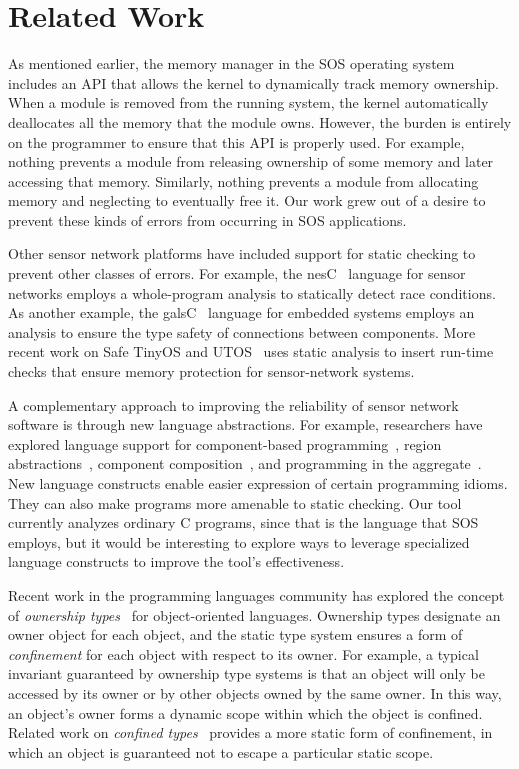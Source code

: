 \section{Related Work}
\label{sec:related}


As mentioned earlier, the memory manager in the SOS operating
system~\cite{sos} includes an API that allows the kernel
to dynamically track memory ownership.  When a module is removed from the
running system, the kernel automatically deallocates all the memory that the
module owns.  However, the burden is entirely on the programmer to
ensure that this API is properly used.  For
example, nothing prevents a
module from releasing ownership of some memory and later accessing
that memory.  
Similarly, nothing prevents a module from allocating memory
and neglecting to eventually free it.  
Our work grew out of a desire to
prevent these kinds of errors from occurring in SOS applications.


Other sensor network platforms have included support for static
checking to prevent other classes of errors.  For example, the
nesC~\cite{nesC} language for sensor networks employs a whole-program
analysis to statically detect race conditions.  As another example,
the galsC~\cite{TinyGALS,galsC} language for embedded systems employs
an analysis to ensure the type safety of connections between
components.  More recent work on Safe TinyOS and
UTOS~\cite{regehr06memory} uses static analysis to insert run-time
checks that ensure memory protection for sensor-network systems.

A complementary approach to improving the reliability of sensor
network software is through new language abstractions.  For example,
researchers have explored language support for component-based
programming~\cite{TinyOS,nesC,galsC}, region
abstractions~\cite{conf/mobisys/WhitehouseSCB04,conf/nsdi/WelshM04},
component composition~\cite{conf/sensys/GreensteinKE04}, and
programming in the aggregate~\cite{1052213,conf/dcoss/GummadiGG05}.
New language constructs enable easier expression of certain
programming idioms.  They can also make programs more amenable to
static checking.  Our tool currently analyzes ordinary C programs,
since that is the language that SOS employs, but it would be
interesting to explore ways to leverage specialized language
constructs to improve the tool's effectiveness.


Recent work in the programming languages community has explored the
concept of {\em ownership
types}~\cite{ownership,ownership2,BoyapatiEtAl02,aliasjava} for
object-oriented languages.  Ownership types designate an owner object
for each object, and the static type system ensures a form of {\em
confinement} for each object with respect to its owner.  For example,
a typical invariant guaranteed by ownership type systems is that an
object will only be accessed by its owner or by other objects owned by
the same owner.  In this way, an object's owner forms a dynamic scope
within which the object is confined.  Related work on {\em confined
types}~\cite{confined1,confined2} provides a more static form of
confinement, in which an object is guaranteed not to escape a
particular static scope.


